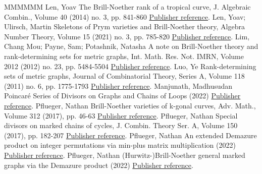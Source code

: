 \begin{thebibliography}{MMMMMM}
 Len, Yoav The Brill-Noether rank of a tropical curve, J. Algebraic Combin., Volume 40 (2014) no. 3, pp. 841-860 \href{https://alco.centre-mersenne.org/articles/10.5802/alco.443/#len14}{Publisher reference}.
 Len, Yoav; Ulirsch, Martin Skeletons of Prym varieties and Brill-Noether theory, Algebra Number Theory, Volume 15 (2021) no. 3, pp. 785-820 \href{https://alco.centre-mersenne.org/articles/10.5802/alco.443/#LenUlirsch}{Publisher reference}.
 Lim, Chang Mou; Payne, Sam; Potashnik, Natasha A note on Brill-Noether theory and rank-determining sets for metric graphs, Int. Math. Res. Not. IMRN, Volume 2012 (2012) no. 23, pp. 5484-5504 \href{https://alco.centre-mersenne.org/articles/10.5802/alco.443/#lpp}{Publisher reference}.
 Luo, Ye Rank-determining sets of metric graphs, Journal of Combinatorial Theory, Series A, Volume 118 (2011) no. 6, pp. 1775-1793 \href{https://alco.centre-mersenne.org/articles/10.5802/alco.443/#RDS}{Publisher reference}.
 Manjunath, Madhusudan Poincaré Series of Divisors on Graphs and Chains of Loops (2022) \href{https://alco.centre-mersenne.org/articles/10.5802/alco.443/#manjunath2020poincar}{Publisher reference}.
 Pflueger, Nathan Brill-Noether varieties of k-gonal curves, Adv. Math., Volume 312 (2017), pp. 46-63 \href{https://alco.centre-mersenne.org/articles/10.5802/alco.443/#PflKGonal}{Publisher reference}.
 Pflueger, Nathan Special divisors on marked chains of cycles, J. Combin. Theory Ser. A, Volume 150 (2017), pp. 182-207 \href{https://alco.centre-mersenne.org/articles/10.5802/alco.443/#Pfl17}{Publisher reference}.
 Pflueger, Nathan An extended Demazure product on integer permutations via min-plus matrix multiplication (2022) \href{https://alco.centre-mersenne.org/articles/10.5802/alco.443/#PflDemProd}{Publisher reference}.
 Pflueger, Nathan (Hurwitz-)Brill-Noether general marked graphs via the Demazure product (2022) \href{https://alco.centre-mersenne.org/articles/10.5802/alco.443/#Pfl22}{Publisher reference}.
\end{thebibliography}
